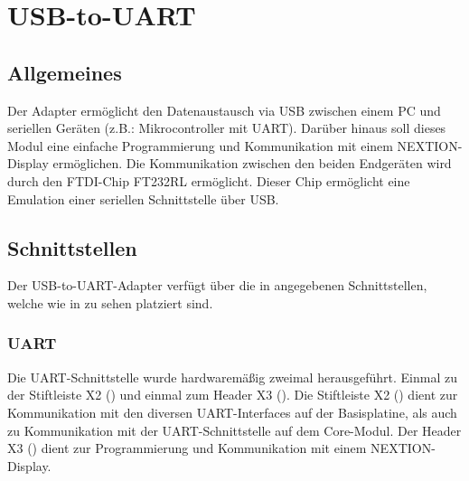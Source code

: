 \section{USB-to-UART}
\label{sec:usbtouart}


\subsection{Allgemeines}
\label{sec:usbtouart-allgemeines}
Der Adapter ermöglicht den Datenaustausch via USB zwischen einem PC und seriellen Geräten (z.B.: Mikrocontroller mit UART). Darüber hinaus soll dieses Modul eine einfache Programmierung und Kommunikation mit einem NEXTION-Display ermöglichen. Die Kommunikation zwischen den beiden Endgeräten wird durch den FTDI-Chip FT232RL ermöglicht. Dieser Chip ermöglicht eine Emulation einer seriellen Schnittstelle über USB.

\subsection{Schnittstellen}
\label{sec:usbtouart-schnittstellen}

Der \gls{USB-to-UART}-Adapter verfügt über die in  angegebenen Schnittstellen, welche wie in  zu sehen platziert sind.



\subsubsection{UART}
Die UART-Schnittstelle wurde hardwaremäßig zweimal herausgeführt. Einmal zu der Stiftleiste X2 () und einmal zum Header X3 (). Die Stiftleiste X2 () dient zur Kommunikation mit den diversen UART-Interfaces auf der \gls{Basisplatine}, als auch zu Kommunikation mit der UART-Schnittstelle auf dem \gls{Core-Modul}. Der Header X3 () dient zur Programmierung und Kommunikation mit einem NEXTION-Display.

